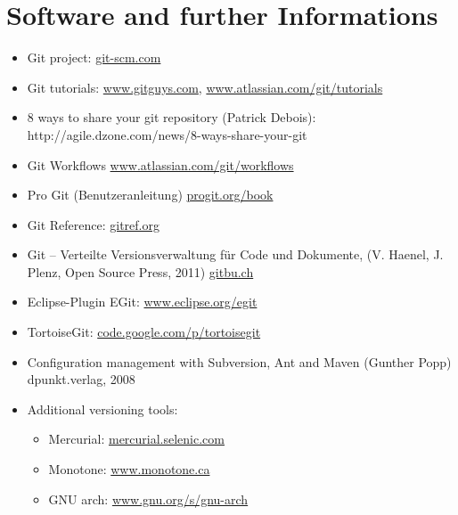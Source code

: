 \section{Software and further Informations}
\begin{itemize}
\item Git project: \href{http://git-scm.com/}{git-scm.com}
\item Git tutorials: \href{http://www.gitguys.com}{www.gitguys.com},
   \href{https://www.atlassian.com/git/tutorials}{www.atlassian.com/git/tutorials}
\item 8 ways to share your git repository (Patrick Debois):\\
  \href{http://agile.dzone.com/news/8-ways-share-your-git}
   {}http://agile.dzone.com/news/8-ways-share-your-git
\item Git Workflows \href{https://www.atlassian.com/git/workflows}
         {www.atlassian.com/git/workflows}
\item Pro Git (Benutzeranleitung)
  \href{http://progit.org/book}{progit.org/book}
\item Git Reference: \href{http://gitref.org}{gitref.org}
\item Git -- Verteilte Versionsverwaltung für Code und Dokumente,
(V. Haenel, J. Plenz, Open Source Press, 2011)
\href{http://gitbu.ch}{gitbu.ch}
\item Eclipse-Plugin EGit:
  \href{http://www.eclipse.org/egit}{www.eclipse.org/egit}
\item TortoiseGit: \href{http://code.google.com/p/tortoisegit}
    {code.google.com/p/tortoisegit}
\item Configuration management with Subversion,
  Ant and Maven (Gunther Popp) dpunkt.verlag, 2008
\label{lit:popp}
\item Additional versioning tools:
\begin{itemize}
\item Mercurial: \href{http://mercurial.selenic.com/}{mercurial.selenic.com}
\item Monotone:
  \href{http://www.monotone.ca}{www.monotone.ca}
\item GNU arch:
  \href{http://www.gnu.org/s/gnu-arch}{www.gnu.org/s/gnu-arch}
\end{itemize}
\end{itemize}

